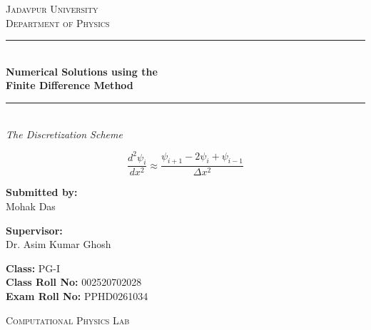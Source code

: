 \documentclass[12pt, a4paper, twoside]{article}
\begin{document}
    \begin{titlepage}
        \centering

        \vspace*{\fill}
        \Huge \textsc{\textcolor{navyblue}{Jadavpur University}}\\
        \LARGE \textsc{Department of Physics}\\[1cm]

        \textcolor{navyblue}{\rule{\linewidth}{0.8mm}} \\[0.4cm] 
        \Huge \textbf{\textcolor{navyblue}{Numerical Solutions using the \\ Finite Difference Method}} \\[0.2cm]
        \textcolor{navyblue}{\rule{\linewidth}{0.8mm}} \\[1.5cm] 

        \large \textit{The Discretization Scheme}\\[0.5cm]

        \begin{tcolorbox}[colback=navyblue!5!white, colframe=navyblue, width=0.8\textwidth, boxrule=0.5mm, arc=2mm, auto outer arc]
            \centering \Large
            $$\frac{d^2\psi_i}{dx^2} \approx \frac{\psi_{i+1} - 2\psi_i + \psi_{i-1}}{\Delta x^2}$$
        \end{tcolorbox}

        \vspace{1.5cm}

        \noindent
        \begin{minipage}{0.4\textwidth}
            \begin{flushleft} \Large
                \textbf{Submitted by:}\\
                \textcolor{navyblue}{Mohak Das}\\
            \end{flushleft}
        \end{minipage}
        \begin{minipage}{0.4\textwidth}
            \begin{flushright} \Large
                \textbf{Supervisor:} \\
                Dr. Asim Kumar Ghosh\\
                \vspace{0.6cm}
            \end{flushright}
        \end{minipage}
        \vspace{1cm}

        \textbf{Class:} PG-I\\
        \textbf{Class Roll No:} 002520702028\\
        \textbf{Exam Roll No:} PPHD0261034
        \vspace{1.5cm}

        \textsc{Computational Physics Lab}

        \vspace*{\fill}


    \end{titlepage}
    \thispagestyle{empty}
\end{document}
